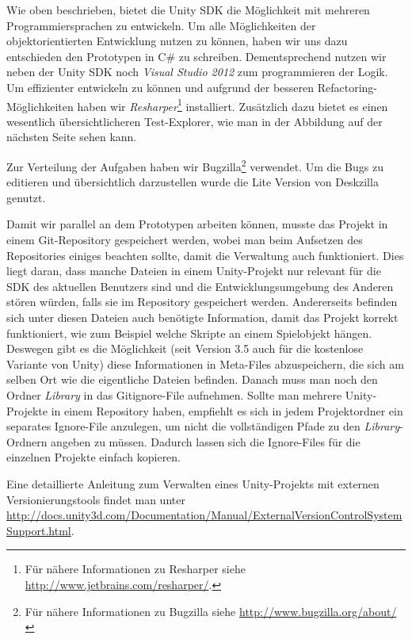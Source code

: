 Wie oben beschrieben, bietet die Unity SDK die Möglichkeit mit mehreren Programmiersprachen zu entwickeln. Um alle Möglichkeiten der objektorientierten Entwicklung nutzen zu können, haben wir uns dazu entschieden den Prototypen in C\# zu schreiben. Dementsprechend nutzen wir neben der Unity SDK noch \textit{Visual Studio 2012} zum programmieren der Logik. Um effizienter entwickeln zu können und aufgrund der besseren Refactoring-Möglichkeiten haben wir \textit{Resharper}\footnote{Für nähere Informationen zu Resharper siehe \url{http://www.jetbrains.com/resharper/}.} installiert. Zusätzlich dazu bietet es einen wesentlich übersichtlicheren Test-Explorer, wie man in der Abbildung auf der nächsten Seite sehen kann.

Zur Verteilung der Aufgaben haben wir Bugzilla\footnote{Für nähere Informationen zu Bugzilla siehe \url{http://www.bugzilla.org/about/}} verwendet. Um die Bugs zu editieren und übersichtlich darzustellen wurde die Lite Version von Deskzilla genutzt.

Damit wir parallel an dem Prototypen arbeiten können, musste das Projekt in einem Git-Repository gespeichert werden, wobei man beim Aufsetzen des Repositories einiges beachten sollte, damit die Verwaltung auch funktioniert. Dies liegt daran, dass manche Dateien in einem Unity-Projekt nur relevant für die SDK des aktuellen Benutzers sind und die Entwicklungsumgebung des Anderen stören würden, falls sie im Repository gespeichert werden. Andererseits befinden sich unter diesen Dateien auch benötigte Information, damit das Projekt korrekt funktioniert, wie zum Beispiel welche Skripte an einem Spielobjekt hängen. Deswegen gibt es die Möglichkeit (seit Version 3.5 auch für die kostenlose Variante von Unity) diese Informationen in Meta-Files abzuspeichern, die sich am selben Ort wie die eigentliche Dateien befinden. Danach muss man noch den Ordner \textit{Library} in das Gitignore-File aufnehmen. Sollte man mehrere Unity-Projekte in einem Repository haben, empfiehlt es sich in jedem Projektordner ein separates Ignore-File anzulegen, um nicht die vollständigen Pfade zu den \textit{Library}-Ordnern angeben zu müssen. Dadurch lassen sich die Ignore-Files für die einzelnen Projekte einfach kopieren.

Eine detaillierte Anleitung zum Verwalten eines Unity-Projekts mit externen Versionierungstools findet man unter \url{http://docs.unity3d.com/Documentation/Manual/ExternalVersionControlSystemSupport.html}.


